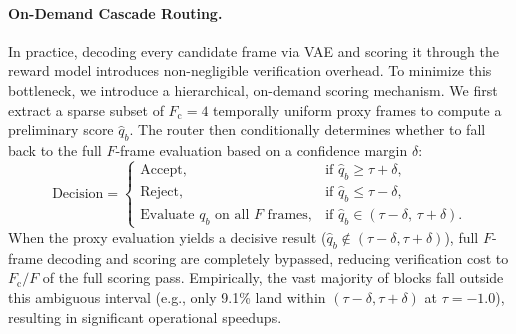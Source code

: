 \documentclass{article} %
\newcommand{\score}{q}
\newcommand{\threshold}{\tau}
\begin{document}
\paragraph{On-Demand Cascade Routing.}
In practice, decoding every candidate frame via VAE and scoring it through the reward model introduces non-negligible verification overhead. To minimize this bottleneck, we introduce a hierarchical, on-demand scoring mechanism. We first extract a sparse subset of $F_{\mathrm{c}} = 4$ temporally uniform proxy frames to compute a preliminary score $\hat{\score}_b$. The router then conditionally determines whether to fall back to the full $F$-frame evaluation based on a confidence margin $\delta$:
\begin{equation}
  \text{Decision} = 
  \begin{cases} 
  \text{Accept}, & \text{if } \hat{\score}_b \ge \threshold + \delta, \\ 
  \text{Reject}, & \text{if } \hat{\score}_b \le \threshold - \delta, \\ 
  \text{Evaluate } \score_b \text{ on all } F \text{ frames}, & \text{if } \hat{\score}_b \in (\threshold - \delta, \, \threshold + \delta).
  \end{cases}
  \label{eq:cascade}
\end{equation}
When the proxy evaluation yields a decisive result ($\hat{\score}_b \notin (\threshold - \delta, \threshold + \delta)$), full $F$-frame decoding and scoring are completely bypassed, reducing verification cost to $F_{\mathrm{c}}/F$ of the full scoring pass. Empirically, the vast majority of blocks fall outside this ambiguous interval (e.g., only 9.1\% land within $(\threshold - \delta, \threshold + \delta)$ at $\threshold = -1.0$), resulting in significant operational speedups.



\end{document}
